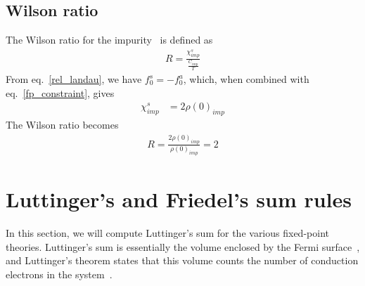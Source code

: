 \documentclass[10pt]{report}
\numberwithin{equation}{section}
\begin{document}
\subsection{Wilson ratio}
The Wilson ratio for the impurity~\cite{wilson1975,nozieres1974fermi,hewson1993} is defined as
\begin{equation}\begin{aligned}
	R = \frac{\chi^s_{imp}}{\frac{C_{imp}}{T}}
\end{aligned}\end{equation}
From eq.~\eqref{rel_landau}, we have \(f_0^s = -f_0^a\), which, when combined with eq.~\eqref{fp_constraint}, gives
\begin{equation}\begin{aligned}
	\chi^s_{imp} &= 2\rho(0)_{imp}
\end{aligned}\end{equation}
The Wilson ratio becomes
\begin{equation}\begin{aligned}
	R = \frac{2\rho(0)_{imp}}{\rho(0)_{imp}} = 2
\end{aligned}\end{equation}

\section{Luttinger's and Friedel's sum rules}
\label{lutt_theorem}
In this section, we will compute Luttinger's sum for the various fixed-point theories. Luttinger's sum is essentially the volume enclosed by the Fermi surface~\cite{luttinger1960fermi,oshikawa2000topological,seki2017topological}, and Luttinger's theorem states that this volume counts the number of conduction electrons in the system~\cite{luttinger1960fermi,oshikawa2000topological,seki2017topological}.
\end{document}
